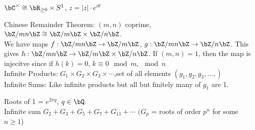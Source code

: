 \begin{example}
    $\bC^{\times} \cong \bR_{\ge 0} \times S^1$, $z = |z| \cdot e^{i \theta}$
\end{example}

\noindent
Chinese Remainder Theorem: $(m, n)$ coprime, $\bZ/mn\bZ \cong \bZ/m\bZ \times \bZ/n\bZ$. \\
We have maps $f: \bZ/mn\bZ \to \bZ/m\bZ$, $g : \bZ / mn\bZ \to \bZ/n\bZ$. This gives $h : \bZ/mn\bZ \to \bZ/m\bZ \times \bZ/n\bZ$. If $(m, n)=1$, then the map is injecitve since if $h(k)=0$, $k \equiv 0 \mod m, \mod n$ \\

\noindent
Infinite Products: $G_1 \times G_2 \times G_3 \times \cdots $,\quad set of all elements $(g_1, g_2, g_3, \ldots, )$ \\
Infinite Sums: Like infinite products but all but finitely many of $g_1$ are 1. 

\begin{example}
    Roots of 1 = $e^{2 \pi q}$, $q \in \bQ$. \\
    Infinite sum $G_2 + G_3 + G_5 + G_7 + G_11 + \cdots$ \quad $(G_p$ = roots of order $p^n$ for some $n \ge 1$)
\end{example}

